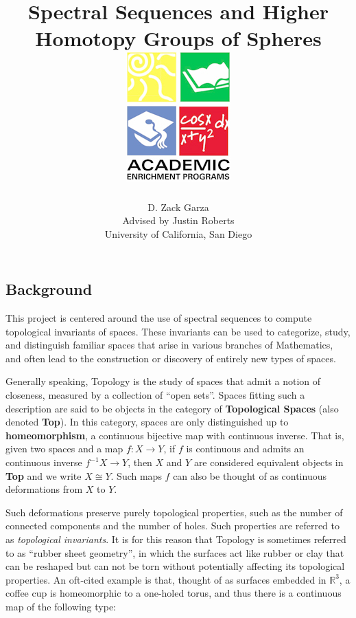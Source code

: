 \documentclass[a0,final]{a0poster}
\title{Spectral Sequences and Higher Homotopy Groups of Spheres\hspace*{10cm}
\includegraphics[]{aep-logo-2}}
\author{D. Zack Garza\\
Advised by Justin Roberts \\
University of California, San Diego }
\begin{document}
\hspace{-3cm}								%
\colorbox{boxcol}{							%
\begin{minipage}{1189mm}					%
\maketitle
\end{minipage}}
\vspace{1cm}

\begin{multicols}{3}							%
\raggedcolumns							%

\section*{Background}
This project is centered around the use of spectral sequences to compute topological invariants of spaces. These invariants can be used to categorize, study, and distinguish familiar spaces that arise in various branches of Mathematics, and often lead to the construction or discovery of entirely new types of spaces.

Generally speaking, Topology is the study of spaces that admit a notion of closeness, measured by a collection of ``open sets''. Spaces fitting such a description are said to be objects in the category of \textbf{Topological Spaces} (also denoted \textbf{Top}). In this category, spaces are only distinguished up to \textbf{homeomorphism}, a continuous bijective map with continuous inverse. That is, given two spaces and a map $f: X \to Y$, if $f$ is continuous and admits an continuous inverse $f^{-1} X \to Y$, then $X$ and $Y$ are considered equivalent objects in \textbf{Top} and we write $X \cong Y$. Such maps $f$ can also be thought of as continuous deformations from $X$ to $Y$. 

Such deformations preserve purely topological properties, such as the number of connected components and the number of holes. Such properties are referred to as \textit{topological invariants}. It is for this reason that Topology is sometimes referred to as ``rubber sheet geometry'', in which the surfaces act like rubber or clay that can be reshaped but can not be torn without potentially affecting its topological properties. An oft-cited example is that, thought of as surfaces embedded in $\mathbb{R}^3$, a coffee cup is homeomorphic to a one-holed torus, and thus there is a continuous map of the following type:


\end{multicols}
\end{document}

